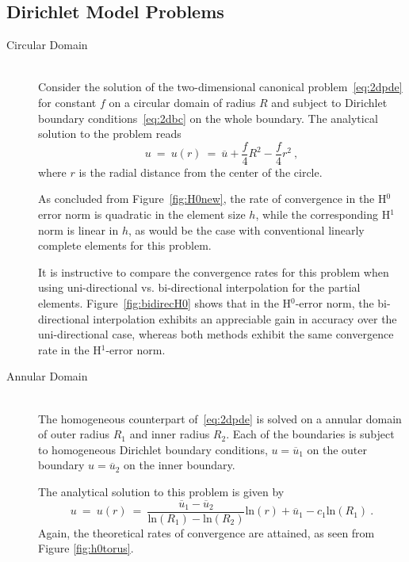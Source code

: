 \documentclass[12pt,twoside]{article}
\begin{document}
\subsection{Dirichlet Model Problems}\label{sec:dirich2d}
\par
\begin{description}
\item[Circular Domain]
\par\noindent
\\
Consider the solution of the two-dimensional canonical problem~\eqref{eq:2dpde} 
for constant $f$ on a circular domain of radius $R$ and subject to Dirichlet 
boundary conditions~\eqref{eq:2dbc} on the whole boundary. 
The analytical solution to the problem reads
%
\begin{equation}
u\ =\ u(r)\ =\ \overline{u} + \frac{f}{4}R^2 - \frac{f}{4}r^2\ , 
\end{equation}
%
where $r$ is the radial distance from the center of the circle. 
\par
As concluded from Figure~\ref{fig:H0new}, 
the rate of convergence in the H$^0$ error norm is quadratic in the
element size $h$, while the corresponding H$^1$ norm is linear in $h$,
as would be the case with conventional linearly complete elements for
this problem. 

It is instructive to compare the convergence rates for this problem
when using uni-directional vs. bi-directional interpolation for the
partial elements. Figure~\ref{fig:bidirecH0} shows that in the 
H$^0$-error norm, the bi-directional interpolation exhibits an
appreciable gain in accuracy over the uni-directional case, whereas
both methods exhibit the same convergence rate in the H$^1$-error norm.
%
\item[Annular Domain] 
\par\noindent
\\
The homogeneous counterpart of~\eqref{eq:2dpde} is solved on a annular
domain of outer radius $R_1$ and inner radius $R_2$. Each of the boundaries 
is subject to homogeneous Dirichlet 
boundary conditions, $u=\overline{u}_1$ on the outer boundary 
$u=\overline{u}_2$ on the inner boundary.

The analytical solution to this problem is given by
%
\begin{equation}
u\ =\ u(r)\ =\ 
\frac{\overline{u}_1 - \overline{u}_2}{\text{ln}(R_1) - \text{ln}(R_2)} 
\text{ln}(r) + \overline{u}_1 - c_1 \text{ln}(R_1)\ .
\end{equation}
%
Again, the theoretical rates of convergence are attained, as seen from
Figure \ref{fig:h0torus}.
\end{description}
\end{document}
